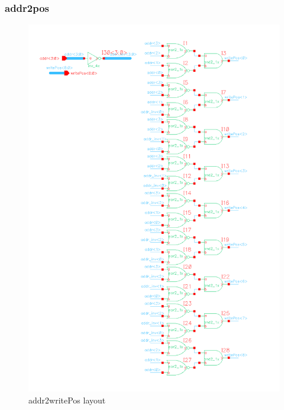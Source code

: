 \documentclass[]{article}
\begin{document}
\subsubsection{addr2pos}
\begin{figure}[H]
\centering
\includegraphics[width=.9\textwidth]{addr2writePos-schematic}
\caption{addr2writePos layout}
\label{fig:addr2writePos-schematic}
\end{figure}
\end{document}
